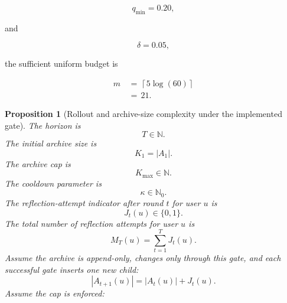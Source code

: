 \documentclass{article} %
\newtheorem{proposition}[theorem]{Proposition}
\begin{document}
\begin{equation}
\label{eq:app-third-coverage-example-q}
q_{\min}
=
0.20,
\end{equation}

and

\begin{equation}
\label{eq:app-third-coverage-example-delta}
\delta
=
0.05,
\end{equation}

the sufficient uniform budget is

\begin{align}
\label{eq:app-third-coverage-example-m}
m
&\,=\,
\left\lceil
5\log(60)
\right\rceil
\\
&\,=\,
21.
\end{align}

\begin{proposition}[Rollout and archive-size complexity under the implemented gate]
\label{prop:3}
The horizon is
\begin{equation}
\label{eq:app-third-rollout-horizon}
T
\in
\mathbb{N}.
\end{equation}
The initial archive size is
\begin{equation}
\label{eq:app-third-rollout-k1}
K_1
=
|A_1|.
\end{equation}
The archive cap is
\begin{equation}
\label{eq:app-third-rollout-kmax}
K_{\max}
\in
\mathbb{N}.
\end{equation}
The cooldown parameter is
\begin{equation}
\label{eq:app-third-rollout-kappa}
\kappa
\in
\mathbb{N}_0.
\end{equation}
The reflection-attempt indicator after round \(t\) for user \(u\) is
\begin{equation}
\label{eq:app-third-rollout-indicator}
J_t(u)
\in
\{0,1\}.
\end{equation}
The total number of reflection attempts for user \(u\) is
\begin{equation}
\label{eq:app-third-rollout-count}
M_T(u)
=
\sum_{t=1}^{T}
J_t(u).
\end{equation}
Assume the archive is append-only, changes only through this gate, and each
successful gate inserts one new child:
\begin{equation}
\label{eq:app-third-rollout-one-child}
|A_{t+1}(u)|
=
|A_t(u)|+J_t(u).
\end{equation}
Assume the cap is enforced:
\begin{equation}
\label{eq:app-third-rollout-cap}

\end{equation}
\end{proposition}
\end{document}
